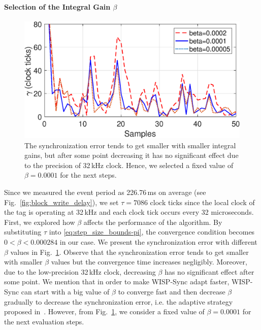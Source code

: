 \documentclass[journal,draftcls,onecolumn,12pt,twoside]{IEEEtranTCOM}
\begin{document}
\paragraph{Selection of the Integral Gain $\beta$} 

\begin{figure}
\centering
\includegraphics[scale=0.35]{figures/integral_gain.eps}
\caption{\label{fig:beta} The synchronization error tends to get smaller with smaller integral gains, but after some point decreasing it has no significant effect due to the precision of 32\,kHz clock. Hence, we selected a fixed value of $\beta=0.0001$ for the next steps. }
\end{figure}

Since we measured the event period as 226.76\,ms on average (see Fig.~\ref{fig:block_write_delay}), we set $\tau=7086$ 
clock ticks since the local clock of the tag is operating at 32\,kHz and each clock tick occurs every 32 microseconds. First, we explored how $\beta$ affects the performance of the algorithm. By substituting $\tau$ into \eqref{eq:step_size_bounds-pi}, the convergence condition becomes $0<\beta<0.000284$ in our case. We present the synchronization error with different $\beta$ values in Fig.~\ref{fig:beta}. Observe that the synchronization error tends to get smaller with smaller $\beta$ values but the convergence time increases negligibly. Moreover, due to the low-precision 32\,kHz clock, decreasing $\beta$ has no significant effect after some point. We mention that  in order to make WISP-Sync adapt faster, WISP-Sync can start with a big value of $\beta$ to converge fast and then decrease $\beta$ gradually to decrease the synchronization error, i.e. the adaptive strategy proposed in~\cite{pi2015}. However, from  Fig.~\ref{fig:beta}, we consider a fixed value of $\beta=0.0001$ for the next evaluation steps. 
\end{document}
